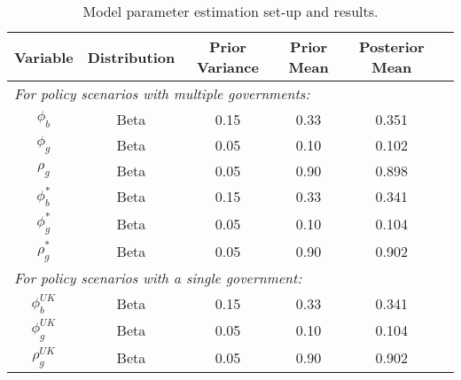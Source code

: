 \begin{table}[H]
    \centering
    \label{tab:priors_and_posteriors}
    \begin{tabular}{cccccc}
        \textbf{Variable} & \textbf{Distribution} & \textbf{Prior Variance} & \textbf{Prior Mean} & \textbf{Posterior Mean} \\
        \hline
        \multicolumn{5}{l}{\textit{For policy scenarios with multiple governments:}} \\
        $\phi_b$ & Beta & 0.15 & 0.33 & 0.351\\
        $\phi_g$ & Beta & 0.05 & 0.10 & 0.102\\
        $\rho_g$ & Beta & 0.05 & 0.90 & 0.898\\
        $\phi_b^*$ & Beta & 0.15 & 0.33 & 0.341\\
        $\phi_g^*$ & Beta & 0.05 & 0.10 & 0.104\\
        $\rho_g^*$ & Beta & 0.05 & 0.90 & 0.902\\
        \multicolumn{5}{l}{\textit{For policy scenarios with a single government:}} \\
        $\phi_b^{UK}$ & Beta & 0.15 & 0.33 & 0.341\\
        $\phi_g^{UK}$ & Beta & 0.05 & 0.10 & 0.104\\
        $\rho_g^{UK}$ & Beta & 0.05 & 0.90 & 0.902\\
    \end{tabular}
    \caption{Model parameter estimation set-up and results.}
\end{table}
